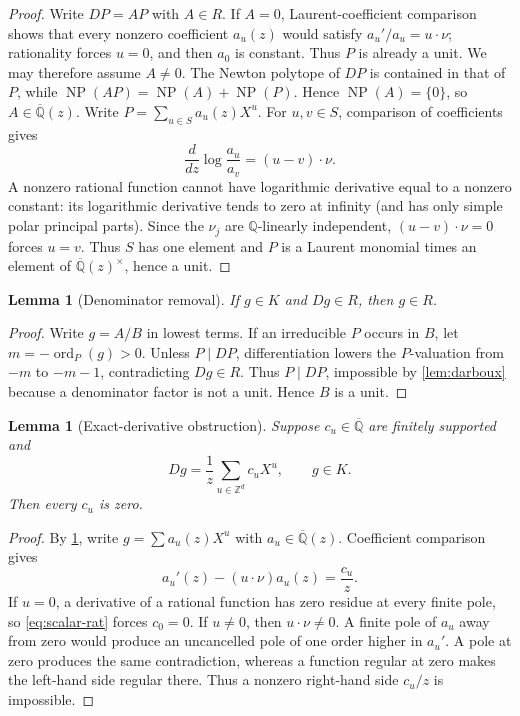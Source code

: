 \documentclass[11pt]{article}
\newtheorem{lemma}[theorem]{Lemma}
\theoremstyle{definition}
\theoremstyle{remark}
\newcommand{\Q}{\mathbb Q}
\newcommand{\Qb}{\overline{\mathbb Q}}
\newcommand{\Z}{\mathbb Z}
\newcommand{\ord}{\operatorname{ord}}
\newcommand{\NP}{\operatorname{NP}}
\begin{document}
\begin{proof}
Write \(DP=AP\) with \(A\in R\).  If \(A=0\), Laurent-coefficient
comparison shows that every nonzero
coefficient \(a_u(z)\) would satisfy
\(a_u'/a_u=u\cdot\nu\); rationality forces \(u=0\), and then \(a_0\) is
constant.  Thus \(P\) is already a unit.  We may therefore assume
\(A\ne0\).  The Newton polytope of \(DP\) is
contained in that of \(P\), while
\(\NP(AP)=\NP(A)+\NP(P)\).  Hence \(\NP(A)=\{0\}\), so
\(A\in\Qb(z)\).  Write
\(P=\sum_{u\in S}a_u(z)X^u\).  For \(u,v\in S\), comparison of coefficients
gives
\[
 \frac{d}{dz}\log\frac{a_u}{a_v}=(u-v)\mathbin{\cdot}\nu.
\]
A nonzero rational function cannot have logarithmic derivative equal to a
nonzero constant: its logarithmic derivative tends to zero at infinity (and
has only simple polar principal parts).  Since the \(\nu_j\) are
\(\Q\)-linearly independent, \((u-v)\cdot\nu=0\) forces \(u=v\).
Thus \(S\) has one element and \(P\) is a Laurent monomial times an element
of \(\Qb(z)^\times\), hence a unit.
\end{proof}

\begin{lemma}[Denominator removal]\label{lem:den-removal}
If \(g\in K\) and \(Dg\in R\), then \(g\in R\).
\end{lemma}

\begin{proof}
Write \(g=A/B\) in lowest terms.  If an irreducible \(P\) occurs in \(B\),
let \(m=-\ord_P(g)>0\).  Unless \(P\mid DP\), differentiation lowers the
\(P\)-valuation from \(-m\) to \(-m-1\), contradicting \(Dg\in R\).
Thus \(P\mid DP\), impossible by \cref{lem:darboux} because a denominator
factor is not a unit.  Hence \(B\) is a unit.
\end{proof}

\begin{lemma}[Exact-derivative obstruction]\label{lem:exact}
Suppose \(c_u\in\Qb\) are finitely supported and
\[
 Dg=\frac1z\sum_{u\in\Z^d}c_uX^u,
 \qquad g\in K.
\]
Then every \(c_u\) is zero.
\end{lemma}

\begin{proof}
By \cref{lem:den-removal}, write \(g=\sum a_u(z)X^u\) with
\(a_u\in\Qb(z)\).  Coefficient comparison gives
\begin{equation}\label{eq:scalar-rat}
 a_u'(z)-(u\cdot\nu)a_u(z)=\frac{c_u}{z}.
\end{equation}
If \(u=0\), a derivative of a rational function has zero residue at every
finite pole, so \eqref{eq:scalar-rat} forces \(c_0=0\).  If \(u\ne0\), then
\(u\cdot\nu\ne0\).  A finite pole of \(a_u\) away from zero would produce an
uncancelled pole of one order higher in \(a_u'\).  A pole at zero produces the
same contradiction, whereas a function regular at zero makes the left-hand
side regular there.  Thus a nonzero right-hand side \(c_u/z\) is impossible.
\end{proof}
\end{document}
